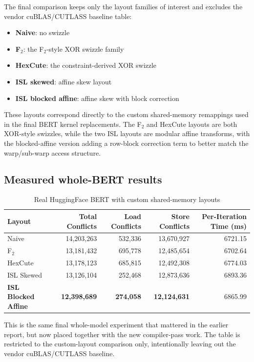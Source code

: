 \documentclass[11pt,a4paper]{article}
\begin{document}
The final comparison keeps only the layout families of interest and excludes
the vendor cuBLAS/CUTLASS baseline table:

\begin{itemize}
\item \textbf{Naive}: no swizzle
\item \textbf{F$_2$}: the F$_2$-style XOR swizzle family
\item \textbf{HexCute}: the constraint-derived XOR swizzle
\item \textbf{ISL skewed}: affine skew layout
\item \textbf{ISL blocked affine}: affine skew with block correction
\end{itemize}

These layouts correspond directly to the custom shared-memory remappings used
in the final BERT kernel replacements.  The F$_2$ and HexCute layouts are both
XOR-style swizzles, while the two ISL layouts are modular affine transforms,
with the blocked-affine version adding a row-block correction term to better
match the warp/sub-warp access structure.

\subsection{Measured whole-BERT results}

\begin{table}[H]
\centering
\caption{Real HuggingFace BERT with custom shared-memory layouts}
\begin{tabular}{lrrrr}
\toprule
Layout & Total Conflicts & Load Conflicts & Store Conflicts & Per-Iteration Time (ms) \\
\midrule
Naive & 14,203,263 & 532,336 & 13,670,927 & 6721.15 \\
F$_2$ & 13,181,432 & 695,778 & 12,485,654 & 6702.64 \\
HexCute & 13,178,123 & 685,815 & 12,492,308 & 6774.03 \\
ISL Skewed & 13,126,104 & 252,468 & 12,873,636 & 6893.36 \\
\textbf{ISL Blocked Affine} & \textbf{12,398,689} & \textbf{274,058} & \textbf{12,124,631} & 6865.99 \\
\bottomrule
\end{tabular}
\end{table}

This is the same final whole-model experiment that mattered in the earlier
report, but now placed together with the new compiler-pass work.  The table is
restricted to the custom-layout comparison only, intentionally leaving out the
vendor cuBLAS/CUTLASS baseline.
\end{document}
